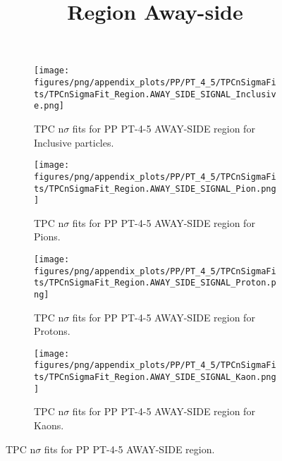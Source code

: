             \begin{figure}[H]
                \title{Region Away-side}
                \begin{subfigure}[b]{0.5\textwidth}
                    \centering
                    \texttt{[image: figures/png/appendix\_plots/PP/PT\_4\_5/TPCnSigmaFits/TPCnSigmaFit\_Region.AWAY\_SIDE\_SIGNAL\_Inclusive.png]}
                    \caption{TPC n$\sigma$ fits for PP PT-4-5 AWAY-SIDE region for Inclusive particles.}
                    \label{fig:appendix_PP_PT-4-5_AWAY_SIDE_SIGNAL_Inclusive}
                \end{subfigure}
                \begin{subfigure}[b]{0.5\textwidth}
                    \centering
                    \texttt{[image: figures/png/appendix\_plots/PP/PT\_4\_5/TPCnSigmaFits/TPCnSigmaFit\_Region.AWAY\_SIDE\_SIGNAL\_Pion.png]}
                    \caption{TPC n$\sigma$ fits for PP PT-4-5 AWAY-SIDE region for Pions.}
                    \label{fig:appendix_PP_PT-4-5_AWAY_SIDE_SIGNAL_Pion}
                \end{subfigure}
                \begin{subfigure}[b]{0.5\textwidth}
                    \centering
                    \texttt{[image: figures/png/appendix\_plots/PP/PT\_4\_5/TPCnSigmaFits/TPCnSigmaFit\_Region.AWAY\_SIDE\_SIGNAL\_Proton.png]}
                    \caption{TPC n$\sigma$ fits for PP PT-4-5 AWAY-SIDE region for Protons.}
                    \label{fig:appendix_PP_PT-4-5_AWAY_SIDE_SIGNAL_Proton}
                \end{subfigure}
                \begin{subfigure}[b]{0.5\textwidth}
                    \centering
                    \texttt{[image: figures/png/appendix\_plots/PP/PT\_4\_5/TPCnSigmaFits/TPCnSigmaFit\_Region.AWAY\_SIDE\_SIGNAL\_Kaon.png]}
                    \caption{TPC n$\sigma$ fits for PP PT-4-5 AWAY-SIDE region for Kaons.}
                    \label{fig:appendix_PP_PT-4-5_AWAY_SIDE_SIGNAL_Kaon}
                \end{subfigure}
                \caption{TPC n$\sigma$ fits for PP PT-4-5 AWAY-SIDE region.}
                \label{fig:appendix_PP_PT-4-5_AWAY_SIDE_SIGNAL}
            \end{figure}

